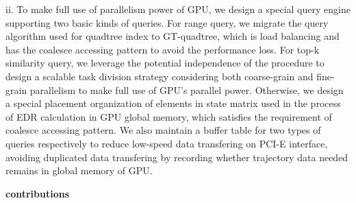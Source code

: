 \documentclass[conference]{IEEEtran}
\begin{document}
	ii. To make full use of parallelism power of GPU, we design a special query engine supporting two basic kinds of queries. For range query, we migrate the query algorithm used for quadtree index to GT-quadtree, which is load balancing and has the coalesce accessing pattern to avoid the performance loss. For top-k similarity query, we leverage the potential independence of the procedure to design a scalable task division strategy considering both coarse-grain and fine-grain parallelism to make full use of GPU's parallel power. Otherwise, we design a special placement organization of elements in state matrix used in the process of EDR calculation in GPU global memory, which satisfies the requirement of coalesce accessing pattern. We also maintain a buffer table for two types of queries respectively to reduce low-speed data transfering on PCI-E interface, avoiding duplicated data transfering by recording whether trajectory data needed remains in global memory of GPU. 
%	
%	
%	
	
\textbf{contributions}
\end{document}
